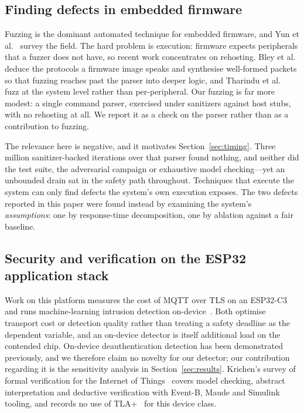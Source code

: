 \subsection{Finding defects in embedded firmware}

Fuzzing is the dominant automated technique for embedded firmware, and Yun et
al.~\cite{fuzzsurvey2022} survey the field. The hard problem is execution: firmware expects
peripherals that a fuzzer does not have, so recent work concentrates on rehosting. Bley et
al.~\cite{pemu2025} deduce the protocols a firmware image speaks and synthesise well-formed
packets so that fuzzing reaches past the parser into deeper logic, and Tharindu et
al.~\cite{sysfuss2026} fuzz at the system level rather than per-peripheral. Our fuzzing is far
more modest: a single command parser, exercised under sanitizers against host stubs, with no
rehosting at all. We report it as a check on the parser rather than as a contribution to
fuzzing.

The relevance here is negative, and it motivates Section~\ref{sec:timing}. Three million
sanitizer-backed iterations over that parser found nothing, and neither did the test suite, the
adversarial campaign or exhaustive model checking---yet an unbounded drain sat in the safety
path throughout. Techniques that execute the system can only find defects the system's own
execution exposes. The two defects reported in this paper were found instead by examining the
system's \emph{assumptions}: one by response-time decomposition, one by ablation against a fair
baseline.

\subsection{Security and verification on the ESP32 application stack}

Work on this platform measures the cost of MQTT over TLS on an ESP32-C3~\cite{mqtttls2026} and
runs machine-learning intrusion detection on-device~\cite{ondevice2026}. Both optimise transport
cost or detection quality rather than treating a safety deadline as the dependent variable, and
an on-device detector is itself additional load on the contended chip. On-device
deauthentication detection has been demonstrated previously, and we therefore claim no novelty
for our detector; our contribution regarding it is the sensitivity analysis in
Section~\ref{sec:results}. Krichen's survey of formal verification for the Internet of
Things~\cite{krichen2023} covers model checking, abstract interpretation and deductive
verification with Event-B, Maude and Simulink tooling, and records no use of
TLA+~\cite{lamport2002} for this device class.

